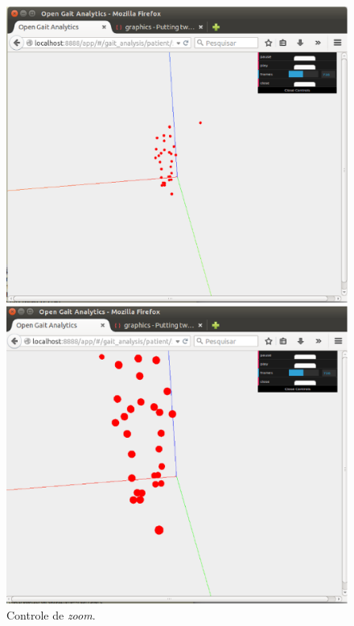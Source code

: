 \begin{figure}[ht]
  \centering
  \begin{minipage}[b]{0.49\textwidth}
    \includegraphics[width=\textwidth]{figuras/tela13.eps}
  \end{minipage}
  \hfill
  \begin{minipage}[b]{0.49\textwidth}
    \includegraphics[width=\textwidth]{figuras/tela14.eps}
  \end{minipage}
  \caption{Controle de \emph{zoom}.}
  \label{animacao3}
\end{figure}

